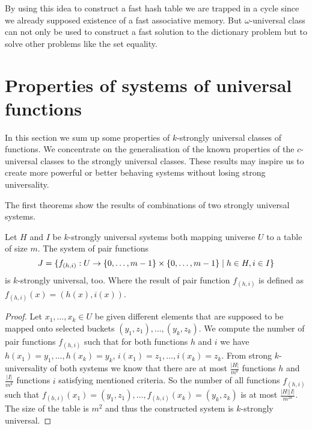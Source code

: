 By using this idea to construct a fast hash table we are trapped in a cycle since we already supposed existence of a fast associative memory. But $\omega$-universal class can not only be used to construct a fast solution to the dictionary problem but to solve other problems like the set equality. %



\section{Properties of systems of universal functions}
In this section we sum up some properties of $k$-strongly universal classes of functions. We concentrate on the generalisation of the known properties of the $c$-universal classes to the strongly universal classes. These results may inspire us to create more powerful or better behaving systems without losing strong universality.

The first theorems show the results of combinations of two strongly universal systems.
\begin{theorem}
Let $H$ and $I$ be $k$-strongly universal systems both mapping universe $U$ to a table of size $m$. The system of pair functions 
\begin{displaymath}
J = \lbrace f_{(h, i)}: U \rightarrow \lbrace 0, \dots, m - 1 \rbrace \times \lbrace 0, \dots, m - 1 \rbrace \mid h \in H, i \in I \rbrace
\end{displaymath} 
is $k$-strongly universal, too. Where the result of pair function $f_{(h, i)}$ is defined as $f_{(h, i)}(x) = (h(x), i(x))$.
\end{theorem}
\begin{proof}
Let $x_1, \dots, x_k \in U$ be given different elements that are supposed to be mapped onto selected buckets $(y_1, z_1), \dots, (y_k, z_k)$. We compute the number of pair functions $f_{(h, i)}$ such that for both functions $h$ and $i$ we have $h(x_1) = y_1, \dots, h(x_k) = y_k$, $i(x_1) = z_1, \dots, i(x_k) = z_k$. From strong $k$-universality of both systems we know that there are at most $\frac{|H|}{m^k}$ functions $h$ and $\frac{|I|}{m^k}$ functions $i$ satisfying mentioned criteria. So the number of all functions $f_{(h, i)}$ such that $f_{(h, i)}(x_1) = (y_1, z_1), \dots, f_{(h, i)}(x_k) = (y_k, z_k)$ is at most $\frac{|H||I|}{m^{2k}}$. The size of the table is $m^2$ and thus the constructed system is $k$-strongly universal.
\end{proof}

